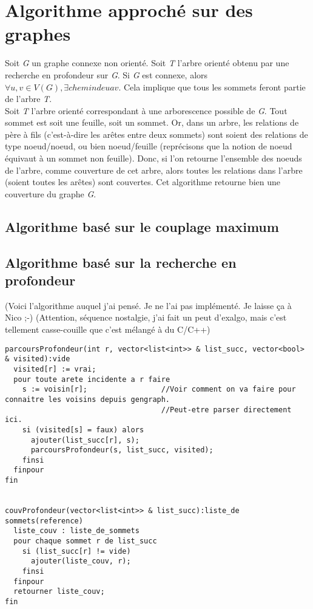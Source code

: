 
\section{Algorithme approch\'e sur des graphes}

Soit \textit{G} un graphe connexe non orient\'e. Soit \textit{T} l'arbre orient\'e obtenu par une recherche en profondeur sur \textit{G}.
Si \textit{G} est connexe, alors \textit{$\forall u,v \in V(G), \exists chemin de u a v$}. Cela implique que tous les sommets
feront partie de l'arbre \textit{T}.\\

Soit \textit{T} l'arbre orient\'e correspondant \`a une arborescence possible de \textit{G}. Tout sommet est soit une feuille,
soit un sommet. Or, dans un arbre, les relations de p\`ere \`a fils (c'est-\`a-dire les ar\^etes entre deux sommets) sont soient
des relations de type noeud/noeud, ou bien noeud/feuille (repr\'ecisons que la notion de noeud \'equivaut \`a un sommet non feuille).
Donc, si l'on retourne l'ensemble des noeuds de l'arbre, comme couverture de cet arbre, alors toutes les relations dans l'arbre (soient
toutes les ar\^etes) sont couvertes. Cet algorithme retourne bien une couverture du graphe \textit{G}.


\subsection{Algorithme bas\'e sur le couplage maximum}


\subsection{Algorithme bas\'e sur la recherche en profondeur}

(Voici l'algorithme auquel j'ai pens\'e. Je ne l'ai pas impl\'ement\'e. Je laisse \c{c}a \`a Nico ;-)
(Attention, s\'equence nostalgie, j'ai fait un peut d'exalgo, mais c'est tellement casse-couille que c'est m\'elang\'e \`a
du C/C++)\\

\begin{verbatim}
parcoursProfondeur(int r, vector<list<int>> & list_succ, vector<bool> & visited):vide
  visited[r] := vrai;
  pour toute arete incidente a r faire
    s := voisin[r];                 //Voir comment on va faire pour connaitre les voisins depuis gengraph.
                                    //Peut-etre parser directement ici.
    si (visited[s] = faux) alors
      ajouter(list_succ[r], s);
      parcoursProfondeur(s, list_succ, visited);
    finsi
  finpour
fin


couvProfondeur(vector<list<int>> & list_succ):liste_de sommets(reference)
  liste_couv : liste_de_sommets
  pour chaque sommet r de list_succ
    si (list_succ[r] != vide)
      ajouter(liste_couv, r);
    finsi
  finpour
  retourner liste_couv;
fin
\end{verbatim}

